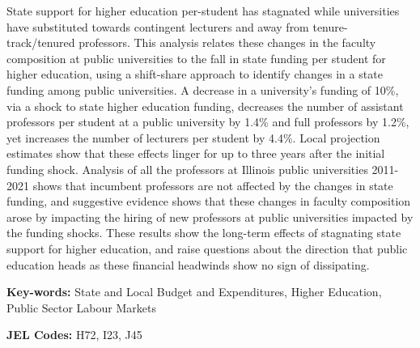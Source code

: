 \noindent
State support for higher education per-student has stagnated while universities have substituted towards contingent lecturers and away from tenure-track/tenured professors.
This analysis relates these changes in the faculty composition at public universities to the fall in state funding per student for higher education, using a shift-share approach to identify changes in a state funding among public universities.
A decrease in a university's funding of 10\%, via a shock to state higher education funding, decreases the number of assistant professors per student at a public university by 1.4\% and full professors by 1.2\%, yet increases the number of lecturers per student by 4.4\%.
Local projection estimates show that these effects linger for up to three years after the initial funding shock.
Analysis of all the professors at Illinois public universities 2011-2021 shows that incumbent professors are not affected by the changes in state funding, and suggestive evidence shows that these changes in faculty composition arose by impacting the hiring of new professors at public universities impacted by the funding shocks.
These results show the long-term effects of stagnating state support for higher education, and raise questions about the direction that public education heads as these financial headwinds show no sign of dissipating.

\vfill
\noindent
\textbf{Key-words:}
State and Local Budget and Expenditures,
Higher Education,
Public Sector Labour Markets

\vspace{0.1cm}
\noindent
\textbf{JEL Codes:} H72, I23, J45

